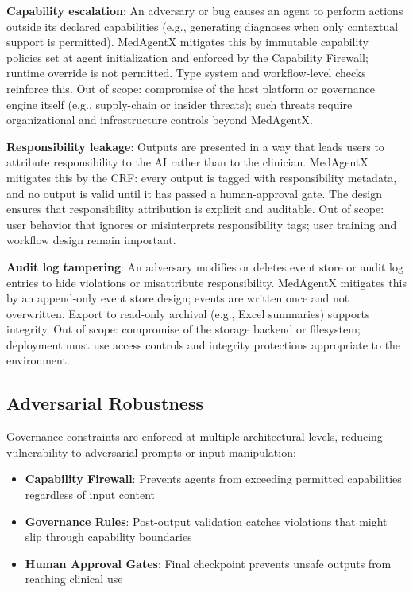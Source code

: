 \documentclass[journal]{IEEEtran}
\begin{document}
\textbf{Capability escalation}: An adversary or bug causes an agent to perform actions outside its declared capabilities (e.g., generating diagnoses when only contextual support is permitted). MedAgentX mitigates this by immutable capability policies set at agent initialization and enforced by the Capability Firewall; runtime override is not permitted. Type system and workflow-level checks reinforce this. Out of scope: compromise of the host platform or governance engine itself (e.g., supply-chain or insider threats); such threats require organizational and infrastructure controls beyond MedAgentX.

\textbf{Responsibility leakage}: Outputs are presented in a way that leads users to attribute responsibility to the AI rather than to the clinician. MedAgentX mitigates this by the CRF: every output is tagged with responsibility metadata, and no output is valid until it has passed a human-approval gate. The design ensures that responsibility attribution is explicit and auditable. Out of scope: user behavior that ignores or misinterprets responsibility tags; user training and workflow design remain important.

\textbf{Audit log tampering}: An adversary modifies or deletes event store or audit log entries to hide violations or misattribute responsibility. MedAgentX mitigates this by an append-only event store design; events are written once and not overwritten. Export to read-only archival (e.g., Excel summaries) supports integrity. Out of scope: compromise of the storage backend or filesystem; deployment must use access controls and integrity protections appropriate to the environment.

\subsection{Adversarial Robustness}
Governance constraints are enforced at multiple architectural levels, reducing vulnerability to adversarial prompts or input manipulation:

\begin{itemize}
    \item \textbf{Capability Firewall}: Prevents agents from exceeding permitted capabilities regardless of input content
    \item \textbf{Governance Rules}: Post-output validation catches violations that might slip through capability boundaries
    \item \textbf{Human Approval Gates}: Final checkpoint prevents unsafe outputs from reaching clinical use
\end{itemize}
\end{document}
